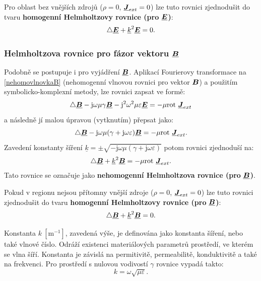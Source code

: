 \documentclass[12pt,a4paper,oneside]{article}
\numberwithin{equation}{section} %
\numberwithin{figure}{section} %
\numberwithin{table}{section} %
\newcommand{\mj}{\mathrm{j}} %
\renewcommand{\vec}[1]{\mbox{\boldmath$#1$}} %
\newcommand{\faz}[1]{{\underline{#1}}} %
\newcommand{\rot}{\mathrm{rot}\ }
\begin{document}
Pro oblast bez vnějších zdrojů ($\rho = 0$, $\faz{\vec{J}} _{ext} = 0$) lze tuto rovnici zjednodušit do tvaru \textbf{homogenní Helmholtzovy rovnice (pro} $\faz{\vec{E}}$\textbf{)}:
\begin{equation}
\label{homohelmholtze}
\triangle \faz{\vec{E}} + \faz{k} ^2 \faz{\vec{E}} = 0 .
\end{equation}

\subsubsection*{Helmholtzova rovnice pro fázor vektoru $\faz{\vec{B}}$}
Podobně se postupuje i pro vyjádření $\faz{\vec{B}}$. Aplikací Fourierovy transformace na \ref{nehomovlnovkaB} (nehomogenní vlnovou rovnici pro vektor $\vec{B}$) a použitím symbolicko-komplexní metody, lze rovnici zapsat ve formě:
\begin{equation}
\triangle \faz{\vec{B}} - \mj \omega \mu \gamma \faz{\vec{B}} - \mj ^2 \omega ^2 \mu \varepsilon \faz{\vec{E}} = - \mu \rot \faz{\vec{J}} _{ext}
\end{equation}
a následně jí malou úpravou (vytknutím) přepsat jako:
\begin{equation}
\triangle \faz{\vec{B}} - \mj \omega \mu (\gamma + \mj \omega \varepsilon) \faz{\vec{B}} = - \mu \rot \faz{\vec{J}} _{ext} .
\end{equation}
Zavedení konstanty šíření $\faz{k} = \pm \sqrt{- \mj \omega \mu (\gamma + \mj \omega \varepsilon)}$ potom rovnici zjednoduší na:
\begin{equation}
\triangle \faz{\vec{B}} + \faz{k} ^2 \faz{\vec{B}} = - \mu \rot \faz{\vec{J}} _{ext} .
\end{equation}
Tato rovnice se označuje jako \textbf{nehomogenní Helmholtzova rovnice (pro} $\faz{\vec{B}}$\textbf{)}.

Pokud v regionu nejsou přítomny vnější zdroje ($\rho = 0$, $\faz{\vec{J}} _{ext} = 0$) lze tuto rovnici zjednodušit do tvaru \textbf{homogenní Helmholtzovy rovnice (pro} $\faz{\vec{B}}$\textbf{)}:
\begin{equation}
\label{homohelmholtzb}
\triangle \faz{\vec{B}} + \faz{k} ^2 \faz{\vec{B}} = 0 .
\end{equation}

Konstanta $k ~\mathrm{[m ^{-1}]}$, zavedená výše, je definována jako konstanta šíření, nebo také  vlnové číslo. Odráží existenci materiálových parametrů prostředí, ve kterém se vlna šíří. Konstanta je závislá na permitivitě, permeabilitě, konduktivitě a také na frekvenci. Pro prostředí s nulovou vodivostí $\gamma$ rovnice vypadá takto:
\begin{equation}
k = \omega \sqrt{\mu \varepsilon} .
\end{equation}
\end{document}
